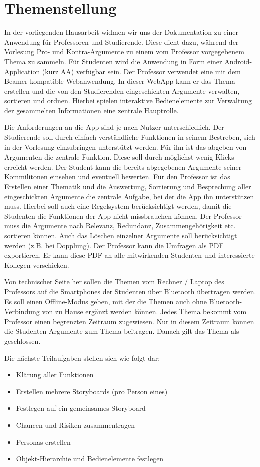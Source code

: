 \chapter{Themenstellung}
\label{chap:intro}

In der vorliegenden Hausarbeit widmen wir uns der Dokumentation zu einer Anwendung für Professoren und Studierende. Diese dient dazu, während der Vorlesung Pro- und Kontra-Argumente zu einem vom Professor vorgegebenem Thema zu sammeln. 
Für Studenten wird die Anwendung in Form einer Android-Application (kurz AA) verfügbar sein. Der Professor verwendet eine mit dem Beamer kompatible Webanwendung. In dieser WebApp kann er  das Thema erstellen und die von den Studierenden eingeschickten Argumente verwalten, sortieren und ordnen.
Hierbei spielen interaktive Bedienelemente zur Verwaltung der gesammelten Informationen eine zentrale Hauptrolle. 

Die Anforderungen an die App sind je nach Nutzer unterschiedlich. Der Studierende soll durch einfach verständliche Funktionen in seinem Bestreben, sich in der Vorlesung einzubringen unterstützt werden. Für ihn ist das abgeben von Argumenten die zentrale Funktion. Diese soll durch möglichst wenig Klicks erreicht werden. Der Student kann die bereits abgegebenen Argumente seiner Kommilitonen einsehen und eventuell bewerten. 
Für den Professor ist das Erstellen einer Thematik und die Auswertung, Sortierung und Besprechung aller eingeschickten Argumente die zentrale Aufgabe, bei der die App ihn unterstützen muss. Hierbei soll auch eine Regelsystem berücksichtigt werden, damit  die Studenten die Funktionen der App nicht missbrauchen können. Der Professor muss die Argumente nach Relevanz, Redundanz, Zusammengehörigkeit etc. sortieren können. Auch das Löschen einzelner Argumente soll berücksichtigt werden (z.B. bei Dopplung). Der Professor kann die Umfragen als PDF exportieren. Er kann diese PDF an alle mitwirkenden Studenten und interessierte Kollegen verschicken. 

Von technischer Seite her sollen die Themen vom Rechner / Laptop des Professors auf die Smartphones der Studenten über Bluetooth übertragen werden. Es soll einen Offline-Modus geben, mit der die Themen auch ohne Bluetooth-Verbindung von zu Hause ergänzt werden können. 
Jedes Thema bekommt vom Professor einen begrenzten Zeitraum zugewiesen. Nur in diesem Zeitraum können die Studenten Argumente zum Thema beitragen. Danach gilt das Thema als geschlossen.

Die nächste Teilaufgaben stellen sich wie folgt dar:
\begin{itemize}
\item Klärung aller Funktionen
\item Erstellen mehrere Storyboards (pro Person eines)
\item Festlegen auf ein gemeinsames Storyboard
\item Chancen und Risiken zusammentragen
\item Personas erstellen
\item Objekt-Hierarchie und Bedienelemente festlegen
\end{itemize}

 

